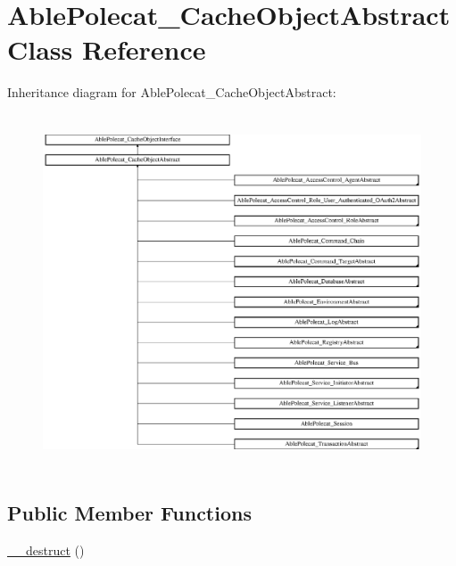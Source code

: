 \hypertarget{class_able_polecat___cache_object_abstract}{}\section{Able\+Polecat\+\_\+\+Cache\+Object\+Abstract Class Reference}
\label{class_able_polecat___cache_object_abstract}
Inheritance diagram for Able\+Polecat\+\_\+\+Cache\+Object\+Abstract\+:\begin{figure}[H]
\begin{center}
\leavevmode
\includegraphics[height=10.566038cm]{class_able_polecat___cache_object_abstract}
\end{center}
\end{figure}
\subsection*{Public Member Functions}
\begin{DoxyCompactItemize}
\item 
\hyperlink{class_able_polecat___cache_object_abstract_a421831a265621325e1fdd19aace0c758}{\+\_\+\+\_\+destruct} ()
\end{DoxyCompactItemize}
